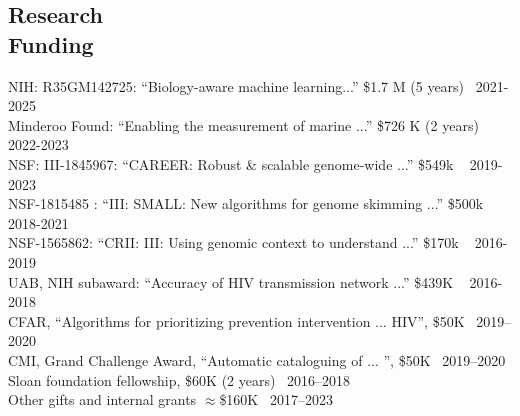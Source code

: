 \documentclass[margin,line,letterpaper]{resume-small}
\begin{document}
\begin{resume}
\begin{small}
 \vspace{-2mm}
    \section{\mysidestyle Research\\Funding}
    NIH: R35GM142725: ``Biology-aware machine learning...''  \$1.7 M (5 years)~
 \hfill 2021-2025\\
     Minderoo Found: ``Enabling the measurement of marine ...''  \$726 K (2 years)~
 \hfill 2022-2023\\
      NSF: III-1845967:  ``CAREER: Robust \& scalable genome-wide ...''
 \$549k ~
 \hfill 2019-2023\\
      NSF-1815485 :  ``III: SMALL: New algorithms for genome skimming ...''
 \hfill \$500k ~
 \hfill 2018-2021\\
 NSF-1565862:  ``CRII: III: Using genomic context to understand ...''
 \hfill  \$170k ~
 \hfill 2016-2019\\
 UAB, NIH subaward:  ``Accuracy of HIV transmission network ...''
 \hfill  \$439K ~
 \hfill 2016-2018\\
 CFAR, ``Algorithms for prioritizing prevention intervention ... HIV'', \$50K \hfill  ~2019--2020\\
  CMI, Grand Challenge Award, ``Automatic cataloguing of ... '', \$50K \hfill  ~2019--2020\\
  Sloan foundation fellowship, \$60K (2 years) \hfill  ~2016--2018\\
 Other gifts and internal grants $\approx$\$160K  \hfill  ~2017--2023

 

\end{small}
\end{resume}
\end{document}
